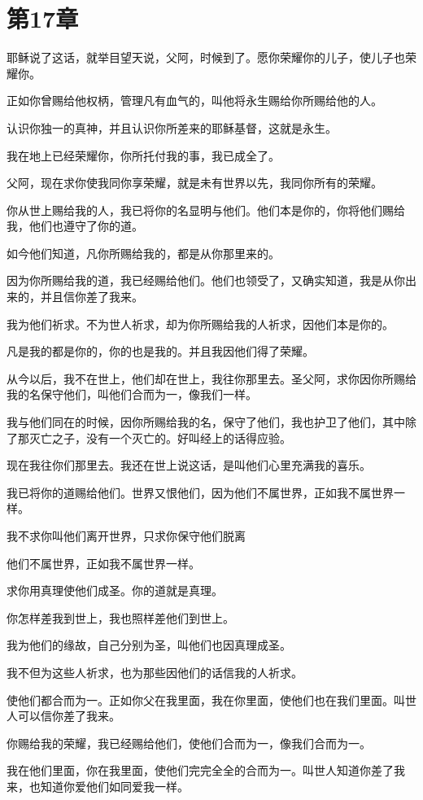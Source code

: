 \documentclass[12pt,oneside]{book}
\begin{document}
\chapter{第17章}
耶稣说了这话，就举目望天说，父阿，时候到了。愿你荣耀你的儿子，使儿子也荣耀你。

正如你曾赐给他权柄，管理凡有血气的，叫他将永生赐给你所赐给他的人。

认识你独一的真神，并且认识你所差来的耶稣基督，这就是永生。

我在地上已经荣耀你，你所托付我的事，我已成全了。

父阿，现在求你使我同你享荣耀，就是未有世界以先，我同你所有的荣耀。

你从世上赐给我的人，我已将你的名显明与他们。他们本是你的，你将他们赐给我，他们也遵守了你的道。

如今他们知道，凡你所赐给我的，都是从你那里来的。

因为你所赐给我的道，我已经赐给他们。他们也领受了，又确实知道，我是从你出来的，并且信你差了我来。

我为他们祈求。不为世人祈求，却为你所赐给我的人祈求，因他们本是你的。

凡是我的都是你的，你的也是我的。并且我因他们得了荣耀。

从今以后，我不在世上，他们却在世上，我往你那里去。圣父阿，求你因你所赐给我的名保守他们，叫他们合而为一，像我们一样。

我与他们同在的时候，因你所赐给我的名，保守了他们，我也护卫了他们，其中除了那灭亡之子，没有一个灭亡的。好叫经上的话得应验。

现在我往你们那里去。我还在世上说这话，是叫他们心里充满我的喜乐。

我已将你的道赐给他们。世界又恨他们，因为他们不属世界，正如我不属世界一样。

我不求你叫他们离开世界，只求你保守他们脱离

他们不属世界，正如我不属世界一样。

求你用真理使他们成圣。你的道就是真理。

你怎样差我到世上，我也照样差他们到世上。

我为他们的缘故，自己分别为圣，叫他们也因真理成圣。

我不但为这些人祈求，也为那些因他们的话信我的人祈求。

使他们都合而为一。正如你父在我里面，我在你里面，使他们也在我们里面。叫世人可以信你差了我来。

你赐给我的荣耀，我已经赐给他们，使他们合而为一，像我们合而为一。

我在他们里面，你在我里面，使他们完完全全的合而为一。叫世人知道你差了我来，也知道你爱他们如同爱我一样。
\end{document}
